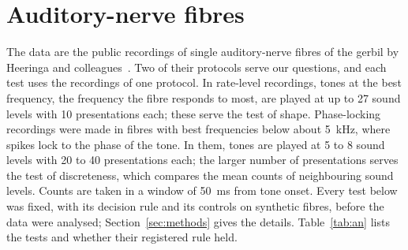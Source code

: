 
\section{Auditory-nerve fibres}\label{sec:an}

The data are the public recordings of single auditory-nerve fibres of the gerbil by Heeringa and colleagues~\cite{Heeringa2024}.
Two of their protocols serve our questions, and each test uses the recordings of one protocol. In rate-level recordings, tones at the
best frequency, the frequency the fibre responds to most, are played at up to 27 sound levels with 10 presentations each; these serve
the test of shape. Phase-locking recordings were made in fibres with best frequencies below about 5~kHz, where spikes lock to the phase
of the tone. In them, tones are played at 5 to 8 sound levels with 20 to 40 presentations each; the larger number of presentations serves the
test of discreteness, which compares the mean counts of neighbouring sound levels. Counts are taken in a window of 50~ms from tone onset.
Every test below was fixed, with its decision rule and its controls on synthetic fibres, before the data were analysed;
Section~\ref{sec:methods} gives the details. Table~\ref{tab:an} lists the tests and whether their registered rule held.

